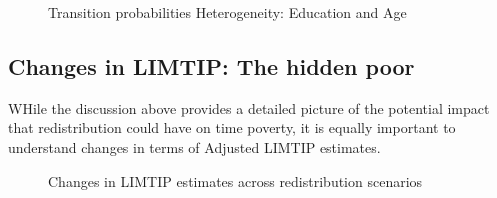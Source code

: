 \documentclass[
  11pt,
]{article}
\begin{document}
\begin{figure}[H]


\caption{\label{fig-tran_by_group2}Transition probabilities
Heterogeneity: Education and Age}

\end{figure}%

\subsection{Changes in LIMTIP: The hidden
poor}\label{changes-in-limtip-the-hidden-poor}

WHile the discussion above provides a detailed picture of the potential
impact that redistribution could have on time poverty, it is equally
important to understand changes in terms of Adjusted LIMTIP estimates.

\begin{figure}[H]


\caption{\label{fig-limtip}Changes in LIMTIP estimates across
redistribution scenarios}

\end{figure}%
\end{document}

